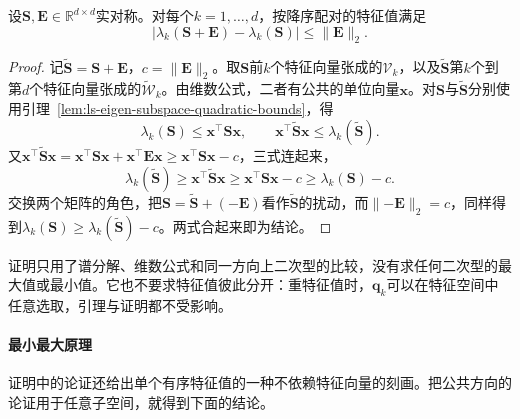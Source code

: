 \begin{theorem}[Weyl特征值扰动界]
\label{thm:ls-weyl-eigenvalue}
设$\bm S,\bm E\in\mathbb R^{d\times d}$实对称。对每个$k=1,\ldots,d$，按降序配对的特征值满足
\begin{equation}
 |\lambda_k(\bm S+\bm E)-\lambda_k(\bm S)|\leq\lVert\bm E\rVert_2 .
 \label{eq:matrix-analysis-weyl-eigenvalue-perturbation}
\end{equation}
\end{theorem}
\begin{proof}
记$\widetilde{\bm S}=\bm S+\bm E$，$c=\lVert\bm E\rVert_2$。取$\bm S$前$k$个特征向量张成的$\mathcal V_k$，以及$\widetilde{\bm S}$第$k$个到第$d$个特征向量张成的$\widetilde{\mathcal W}_k$。由维数公式，二者有公共的单位向量$\bm x$。对$\bm S$与$\widetilde{\bm S}$分别使用引理~\ref{lem:ls-eigen-subspace-quadratic-bounds}，得
\[
 \lambda_k(\bm S)\leq\bm x^\top\bm S\bm x,\qquad
 \bm x^\top\widetilde{\bm S}\bm x\leq\lambda_k(\widetilde{\bm S}).
\]
又$\bm x^\top\widetilde{\bm S}\bm x=\bm x^\top\bm S\bm x+\bm x^\top\bm E\bm x\geq\bm x^\top\bm S\bm x-c$，三式连起来，
\[
 \lambda_k(\widetilde{\bm S})\geq\bm x^\top\widetilde{\bm S}\bm x\geq\bm x^\top\bm S\bm x-c\geq\lambda_k(\bm S)-c .
\]
交换两个矩阵的角色，把$\bm S=\widetilde{\bm S}+(-\bm E)$看作$\widetilde{\bm S}$的扰动，而$\lVert-\bm E\rVert_2=c$，同样得到$\lambda_k(\bm S)\geq\lambda_k(\widetilde{\bm S})-c$。两式合起来即为结论。
\end{proof}

证明只用了谱分解、维数公式和同一方向上二次型的比较，没有求任何二次型的最大值或最小值。它也不要求特征值彼此分开：重特征值时，$\bm q_k$可以在特征空间中任意选取，引理与证明都不受影响。

\paragraph{最小最大原理}

证明中的论证还给出单个有序特征值的一种不依赖特征向量的刻画。把公共方向的论证用于任意子空间，就得到下面的结论。

